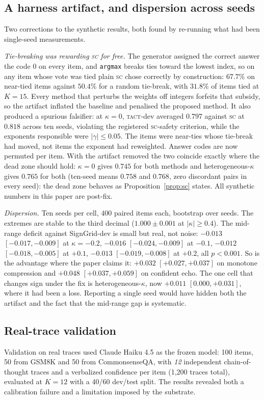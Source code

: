 \documentclass[conference]{IEEEtran}
\newcommand{\SC}{\textsc{sc}}
\newcommand{\TACT}{\textsc{tact}}
\begin{document}
\subsection{A harness artifact, and dispersion across seeds}\label{sec:seeds}
Two corrections to the synthetic results, both found by re-running what had
been single-seed measurements.

\emph{Tie-breaking was rewarding \SC{} for free.} The generator assigned the
correct answer the code $0$ on every item, and \texttt{argmax} breaks ties
toward the lowest index, so on any item whose vote was tied plain \SC{} chose
correctly by construction: $67.7\%$ on near-tied items against $50.4\%$ for a
random tie-break, with $31.8\%$ of items tied at $K{=}15$. Every method that
perturbs the weights off integers forfeits that subsidy, so the artifact
inflated the baseline and penalised the proposed method. It also produced a
spurious falsifier: at $\kappa=0$, \TACT-dev averaged $0.797$ against \SC{} at
$0.818$ across ten seeds, violating the registered \SC{}-safety criterion, while the exponents responsible were
$|\gamma|\le0.05$. The items were near-ties whose tie-break had moved, not
items the exponent had reweighted. Answer codes are now permuted per item.
With the artifact removed the two coincide exactly where the dead zone
should hold: $\kappa=0$ gives $0.745$ for both methods and
heterogeneous-$\kappa$ gives $0.765$ for both (ten-seed means $0.758$ and
$0.768$, zero discordant pairs in every seed): the dead zone behaves as
Proposition~\ref{prop:sc} states. All synthetic numbers in this paper are
post-fix.

\emph{Dispersion.} Ten seeds per cell, $400$ paired items each, bootstrap over
seeds. The extremes are stable to the third decimal ($1.000\pm0.001$ at
$|\kappa|\ge0.4$). The mid-range deficit against SignGrid-dev is small but
real, not noise: $-0.013$ $[-0.017,-0.009]$ at $\kappa=-0.2$, $-0.016$
$[-0.024,-0.009]$ at $-0.1$, $-0.012$ $[-0.018,-0.005]$ at $+0.1$, $-0.013$
$[-0.019,-0.008]$ at $+0.2$, all $p<0.001$. So is the advantage where the
paper claims it: $+0.032$ $[+0.027,+0.037]$ on monotone compression and
$+0.048$ $[+0.037,+0.059]$ on confident echo. The one cell that changes sign
under the fix is heterogeneous-$\kappa$, now $+0.011$ $[0.000,+0.031]$, where it had
been a loss. Reporting a single seed would have hidden both the artifact and
the fact that the mid-range gap is systematic.


\subsection{Real-trace validation}\label{sec:real}
Validation on real traces used Claude Haiku 4.5 as the frozen model: 100 items, 50 from
GSM8K \cite{gsm8k2021} and 50 from CommonsenseQA, with \emph{12} independent
chain-of-thought traces and a verbalized confidence per item (1{,}200 traces
total), evaluated at $K{=}12$ with a 40/60 dev/test split. The results revealed
both a calibration failure and a limitation imposed by the substrate.
\end{document}
